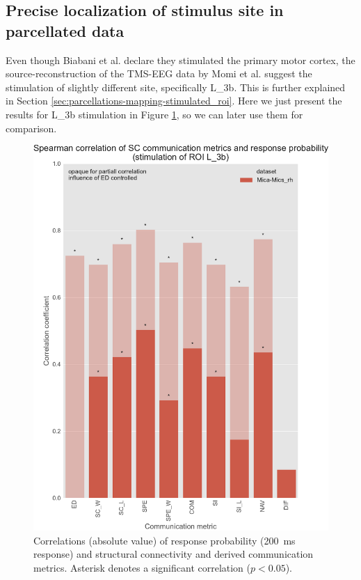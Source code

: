 \subsection{Precise localization of stimulus site in parcellated data}

Even though Biabani et al. \cite{biabani_characterizing_2019} declare they stimulated the primary motor cortex, the source-reconstruction of the TMS-EEG data by Momi et al. \cite{momi_tms-evoked_2023} suggest the stimulation of slightly different site, specifically L\_3b. This is further explained in Section \ref{sec:parcellations-mapping-stimulated_roi}. Here we just present the results for L\_3b stimulation in Figure \ref{fig:ftract_mica_long_probabilities_L3b}, so we can later use them for comparison.

\begin{figure}
    \centering
    \includegraphics[width=\textwidth]{images/nootebook_generated/ftract_results_per_roi/long/MNI-HCP-MMP1/ED0/0.25/Spearman_correlation_of_SC_communication_metrics_and_response_probability_(stimulation_of_ROI_L_3b).pdf}
    \caption[F-Tract probability correlations - Mica-Mics\_rh L\_3b]{Correlations (absolute value) of response probability (200~ms response) and structural connectivity and derived communication metrics. Asterisk denotes a significant correlation ($p<0.05$).}
    \label{fig:ftract_mica_long_probabilities_L3b}
\end{figure}

